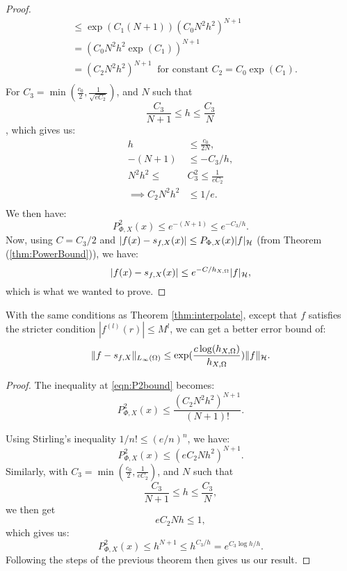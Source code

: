 \documentclass[twoside]{memoir}
\begin{document}
\begin{proof}
\begin{equation}
\begin{split}
	&\leq \exp(C_1(N+1))( C_0 N^2 h^2)^{N+1} \\
	&= (C_0 N^2 h^2\exp(C_1))^{N+1} \\
	&= (C_2 N^2 h^2)^{N+1} ~ \text{ for constant }C_2 = C_0\exp(C_1). \\
	\end{split}
	\end{equation}
	For $C_3 = \min(\frac{c_0}{2}, \frac{1}{\sqrt{e C_2}})$, and $N$ such that
	\[ \frac{C_3}{N+1} \leq h \leq \frac{C_3}{N} \], which gives us:
	\begin{equation*}
	\begin{split}
	h &\leq \frac{c_0}{2N}, \\
	-(N+1) &\leq -C_3/h, \\
	N^2h^2 \leq &C_3^2 \leq \frac{1}{eC_2} \\
	\implies C_2N^2h^2 &\leq  1/e. \\
	\end{split}
	\end{equation*}
	We then have:
	\begin{equation*}
	P^2_{\Phi, X}(x) \leq e^{-(N+1)} \leq e^{-C_3/h}. 
	\end{equation*}
	Now, using $C= C_3/2$ and $|f(x) - s_{f, X}(x)| \leq P_{\Phi, X}(x) |f|_{\mathcal{H}}$ (from Theorem (\ref{thm:PowerBound})), we have:
	\[ |f(x) - s_{f, X}(x)| \leq e^{-C/h_{X,\Omega}} |f|_{\mathcal{H}}, \]
	which is what we wanted to prove.
\end{proof}

\begin{thm}
	With the same conditions as Theorem \ref{thm:interpolate}, except that $f$ satisfies the stricter condition $|f^{(l)}(r)| \leq M^l$, we can get a better error bound of:
	\[ \lVert f - s_{f,X}\rVert_{L_\infty(\Omega)} \leq \exp(\frac{c \log(h_{X,\Omega})}{h_{X,\Omega}})\lVert f\rVert_{\mathcal{H}}. \]
\end{thm}
\begin{proof}
	The inequality at \ref{eqn:P2bound} becomes:
	\[ P^2_{\Phi, X}(x) \leq  \frac{(C_2 N^2 h^2)^{N+1}}{(N+1)!}. \]
	
	Using Stirling's inequality $1/n! \leq (e/n)^n$, we have:
	\[ P^2_{\Phi, X}(x) \leq (eC_2 N h^2)^{N+1}. \]
	Similarly, with $C_3 = \min(\frac{c_0}{2}, \frac{1}{e C_2})$, and $N$ such that
	\[ \frac{C_3}{N+1} \leq h \leq \frac{C_3}{N}, \] we then get \[ eC_2Nh \leq 1, \] which gives us:
	\[ P^2_{\Phi,X}(x) \leq h^{N+1} \leq h^{C_3/h} = e^{C_3 \log h / h}. \]
	Following the steps of the previous theorem then gives us our result.
\end{proof}
\end{document}
